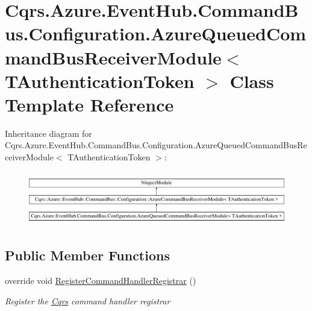 \hypertarget{classCqrs_1_1Azure_1_1EventHub_1_1CommandBus_1_1Configuration_1_1AzureQueuedCommandBusReceiverModule}{}\section{Cqrs.\+Azure.\+Event\+Hub.\+Command\+Bus.\+Configuration.\+Azure\+Queued\+Command\+Bus\+Receiver\+Module$<$ T\+Authentication\+Token $>$ Class Template Reference}
\label{classCqrs_1_1Azure_1_1EventHub_1_1CommandBus_1_1Configuration_1_1AzureQueuedCommandBusReceiverModule}
Inheritance diagram for Cqrs.\+Azure.\+Event\+Hub.\+Command\+Bus.\+Configuration.\+Azure\+Queued\+Command\+Bus\+Receiver\+Module$<$ T\+Authentication\+Token $>$\+:\begin{figure}[H]
\begin{center}
\leavevmode
\includegraphics[height=2.400000cm]{classCqrs_1_1Azure_1_1EventHub_1_1CommandBus_1_1Configuration_1_1AzureQueuedCommandBusReceiverModule}
\end{center}
\end{figure}
\subsection*{Public Member Functions}
\begin{DoxyCompactItemize}
\item 
override void \hyperlink{classCqrs_1_1Azure_1_1EventHub_1_1CommandBus_1_1Configuration_1_1AzureQueuedCommandBusReceiverModule_a30d8ea5555bbb38bfddc6b5aa1e3dd1c_a30d8ea5555bbb38bfddc6b5aa1e3dd1c}{Register\+Command\+Handler\+Registrar} ()
\begin{DoxyCompactList}\small\item\em Register the \hyperlink{namespaceCqrs}{Cqrs} command handler registrar \end{DoxyCompactList}\end{DoxyCompactItemize}


